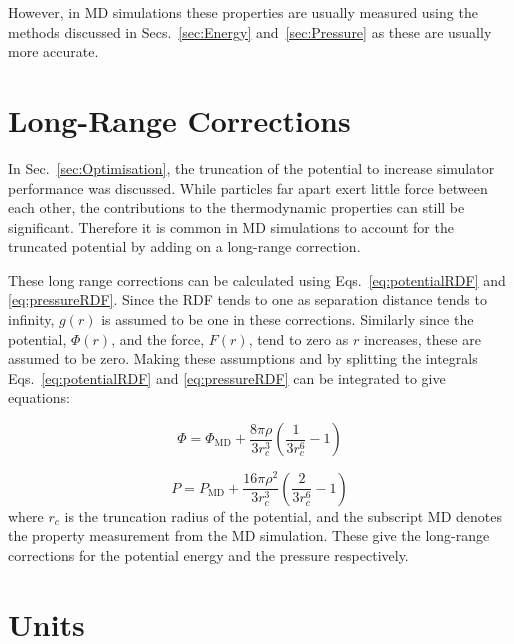 \documentclass[12pt]{UoAthesis} \usepackage{booktabs}
\begin{document}
However, in MD simulations these properties are usually measured using
the methods discussed in Secs.~\ref{sec:Energy}
and~\ref{sec:Pressure} as these are usually more accurate.  

\section{Long-Range Corrections}

In Sec.~\ref{sec:Optimisation}, the truncation of the potential to
increase simulator performance was discussed.  While particles far
apart exert little force between each other, the contributions to the
thermodynamic properties can still be significant.  Therefore it is
common in MD simulations to account for the truncated potential by
adding on a long-range correction.

These long range corrections can be calculated using
Eqs.~\eqref{eq:potentialRDF} and \eqref{eq:pressureRDF}.  Since the
RDF tends to one as separation distance tends to infinity, $g(r)$ is
assumed to be one in these corrections.  Similarly since the
potential, $\Phi(r)$, and the force, $F(r)$, tend to zero as $r$
increases, these are assumed to be zero.  Making these assumptions and
by splitting the integrals Eqs.~\eqref{eq:potentialRDF} and
\eqref{eq:pressureRDF} can be integrated to give equations:

\begin{equation}
  \label{eq:potentialLR}
  \Phi = \Phi_{\text{MD}}+ \frac{8 \pi \rho}{3r_c^3}\left(\frac{1}{3r_c^6} - 1\right)
\end{equation}

\begin{equation}
  \label{eq:pressureLR}
  P = P_{\text{MD}}+ \frac{16 \pi \rho^2}{3r_c^3}\left(\frac{2}{3r_c^6} - 1\right)
\end{equation}
where $r_c$ is the truncation radius of the potential, and the
subscript MD denotes the property measurement from the MD simulation.
These give the long-range corrections for the potential energy and the
pressure respectively.

\section{Units}
\end{document}
